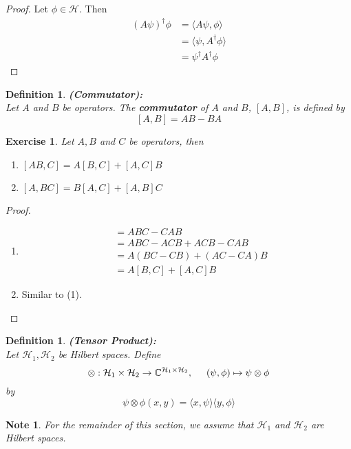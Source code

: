 \documentclass[12pt]{amsart}
\newtheorem{defn}[thm]{Definition}
\newtheorem{note}[thm]{Note}
\newtheorem{ex}[thm]{Exercise}
\renewcommand{\r}{\rangle}
\renewcommand{\l}{\langle}
\newcommand{\C}{\mathbb{C}}
\newcommand{\MH}{\mathcal{H}}
\newcommand{\da}{^{\dagger}}
\begin{document}
\begin{proof}
	Let $\phi \in \MH$. Then 
	\begin{align*}
		(A\psi)\da	\phi 
		&= \l A\psi, \phi \r \\
		&= \l \psi, A\da \phi \r \\
		&= \psi \da A\da \phi 
	\end{align*}
\end{proof}

\begin{defn}\textbf{(Commutator):} \\
	Let $A$ and $B$ be operators. The \textbf{commutator} of $A$ and $B$, $[A,B]$, is defined by $$[A,B] = AB - BA$$
\end{defn}

\begin{ex}
	Let $A,B$ and $C$ be operators, then 
	\begin{enumerate}
		\item $[AB,C] = A[B,C] + [A,C]B$
		\item $[A, BC] = B[A, C] + [A,B]C$
	\end{enumerate}
\end{ex}

\begin{proof} \
	\begin{enumerate}
		\item 
		\begin{align*}
			[AB,C]
			&= ABC - CAB\\
			&= ABC - ACB + ACB -CAB\\
			&= A(BC - CB) + (AC-CA)B\\
			&= A[B,C] + [A,C]B
		\end{align*}
		\item Similar to (1).
	\end{enumerate}
\end{proof}

\begin{defn}\textbf{(Tensor Product):} \\ 
	Let $\MH_1, \MH_2$ be Hilbert spaces. Define $$\otimes: \MH_1 \times \MH_2 \rightarrow \C^{\MH_1 \times \MH_2} ,\hspace{.5cm} (\psi, \phi) \mapsto \psi \otimes \phi$$ by $$\psi \otimes \phi(x,y) = \l x, \psi  \r \l y, \phi\r$$ 
\end{defn}

\begin{note}
	For the remainder of this section, we assume that $\MH_1$ and $\MH_2$ are Hilbert spaces.
\end{note}
\end{document}
